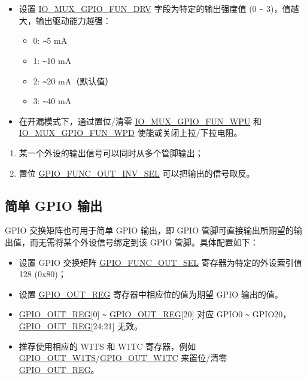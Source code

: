 \documentclass[main\_\_CN.tex]{subfiles}
\begin{document}
\begin{enumerate}
\begin{itemize}
        \item 设置 \hyperref[fielddesc:IOMUXGPIONFUNDRV]{IO\_MUX\_GPIO\_FUN\_DRV} 字段为特定的输出强度值 (0 \verb+~+ 3)，值越大，输出驱动能力越强：
        \begin{itemize}
            \item 0: \verb+~+5 mA
            \item 1: \verb+~+10 mA
            \item 2: \verb+~+20 mA（默认值）
            \item 3: \verb+~+40 mA
        \end{itemize}
        \item 在开漏模式下，通过置位/清零 \hyperref[fielddesc:IOMUXGPIONFUNWPU]{IO\_MUX\_GPIO\_FUN\_WPU} 和 \hyperref[fielddesc:IOMUXGPIONFUNWPD]{IO\_MUX\_GPIO\_FUN\_WPD} 使能或关闭上拉/下拉电阻。
    \end{itemize}
\end{enumerate}

\begin{tiplisting}
\vspace{-2em}
\begin{enumerate}
\item \label{output-note-1} 某一个外设的输出信号可以同时从多个管脚输出；
\item \label{output-note-2} 置位 \hyperref[fielddesc:GPIOFUNCNOUTINVSEL]{GPIO\_FUNC\_OUT\_INV\_SEL} 可以把输出的信号取反。
\end{enumerate}
\end{tiplisting}

\subsection{简单 GPIO 输出}

GPIO 交换矩阵也可用于简单 GPIO 输出，即 GPIO 管脚可直接输出所期望的输出值，而无需将某个外设信号绑定到该 GPIO 管脚。具体配置如下：

\begin{itemize}
    \item 设置 GPIO 交换矩阵 \hyperref[fielddesc:GPIOFUNCNOUTSEL]{GPIO\_FUNC\_OUT\_SEL} 寄存器为特定的外设索引值 128 (0x80)；
    \item 设置 \hyperref[regdesc:GPIOOUTREG]{GPIO\_OUT\_REG} 寄存器中相应位的值为期望 GPIO 输出的值。
\end{itemize}

\begin{tiplisting}
\vspace{-2em}
\begin{itemize}
\item \hyperref[regdesc:GPIOOUTREG]{GPIO\_OUT\_REG}[0] \verb+~+ \hyperref[regdesc:GPIOOUTREG]{GPIO\_OUT\_REG}[20] 对应 GPIO0 \verb+~+ GPIO20， \hyperref[regdesc:GPIOOUTREG]{GPIO\_OUT\_REG}[24:21] 无效。
\item 推荐使用相应的 W1TS 和 W1TC 寄存器，例如 \hyperref[fielddesc:GPIOOUTW1TS]{GPIO\_OUT\_W1TS}/\hyperref[fielddesc:GPIOOUTW1TC]{GPIO\_OUT\_W1TC} 来置位/清零 \hyperref[regdesc:GPIOOUTREG]{GPIO\_OUT\_REG}。
\end{itemize}
\end{tiplisting}
\end{document}
